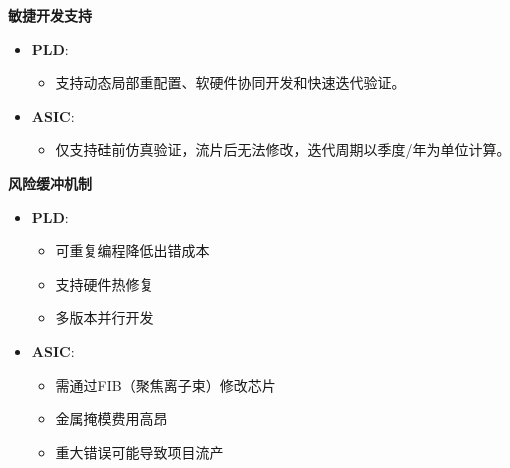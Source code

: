 \documentclass[
  ignorenonframetext,
  chinese,
]{beamer}
\providecommand{\tightlist}{%
  \setlength{\itemsep}{0pt}\setlength{\parskip}{0pt}}
\begin{document}
\begin{frame}
\textbf{敏捷开发支持}

\begin{itemize}
\tightlist
\item
  \textbf{PLD}:

  \begin{itemize}
  \tightlist
  \item
    支持动态局部重配置、软硬件协同开发和快速迭代验证。\\
  \end{itemize}
\item
  \textbf{ASIC}:

  \begin{itemize}
  \tightlist
  \item
    仅支持硅前仿真验证，流片后无法修改，迭代周期以季度/年为单位计算。
  \end{itemize}
\end{itemize}
\end{frame}

\begin{frame}
\textbf{风险缓冲机制}

\begin{itemize}
\tightlist
\item
  \textbf{PLD}:

  \begin{itemize}
  \tightlist
  \item
    可重复编程降低出错成本\\
  \item
    支持硬件热修复\\
  \item
    多版本并行开发\\
  \end{itemize}
\item
  \textbf{ASIC}:

  \begin{itemize}
  \tightlist
  \item
    需通过FIB（聚焦离子束）修改芯片\\
  \item
    金属掩模费用高昂\\
  \item
    重大错误可能导致项目流产
  \end{itemize}
\end{itemize}
\end{frame}
\end{document}
